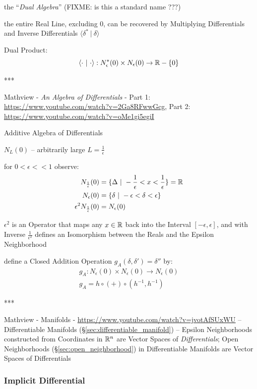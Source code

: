 {the ``\emph{Dual Algebra}''
(FIXME: is this a standard name ???)

the entire Real Line, excluding $0$, can be recovered by Multiplying
Differentials and Inverse Differentials $\langle \delta^* \ |\ \delta \rangle$

Dual Product:
\[
  \langle \cdot \ |\ \cdot\rangle :
    N_\epsilon^*(0) \times N_\epsilon(0) \rightarrow \reals - \{0\}
\]

***

Mathview - \emph{An Algebra of Differentials} -
Part 1: \url{https://www.youtube.com/watch?v=2Ga8RFwwGcg}, Part 2:
\url{https://www.youtube.com/watch?v=oMe1gi5egiI}

Additive Algebra of Differentials

$N_L(0)$ -- arbitrarily large $L = \frac{1}{\epsilon}$

for $0 < \epsilon << 1$ observe:
\begin{align*}
  N_{\frac{1}{\epsilon}}(0) & =
    \{ \Delta \ |\ -\frac{1}{\epsilon} < x < \frac{1}{\epsilon} \} = \mathbb{R} \\
  N_\epsilon(0) & = \{ \delta \ |\ -\epsilon < \delta < \epsilon \} \\
  \epsilon^2 N_{\frac{1}{\epsilon}}(0) & = N_\epsilon(0)
\end{align*}

$\epsilon^2$ is an Operator that maps any $x \in \mathbb{R}$ back into the Interval
$[-\epsilon, \epsilon]$, and with Inverse $\frac{1}{\epsilon^2}$ defines an
Isomorphism between the Reals and the Epsilon Neighborhood

define a Closed Addition Operation $g_A(\delta, \delta') = \delta''$ by:
\begin{align*}
  g_A : N_\epsilon(0) \times N_\epsilon(0) \rightarrow N_\epsilon(0) \\
  g_A = h \circ (+) \circ (h^{-1}, h^{-1})
\end{align*}

***

Mathview - Manifolds - \url{https://www.youtube.com/watch?v=jvotAfSUxWU}
--
Differentiable Manifolds (\S\ref{sec:differentiable_manifold}) -- Epsilon
Neighborhoods constructed from Coordinates in $\mathbb{R}^n$ are Vector Spaces of
\emph{Differentials}; Open Neighborhoods (\S\ref{sec:open_neighborhood}) in
Differentiable Manifolds are Vector Spaces of Differentials



\subsubsection{Implicit Differential}\label{sec:implicit_differential}

}
